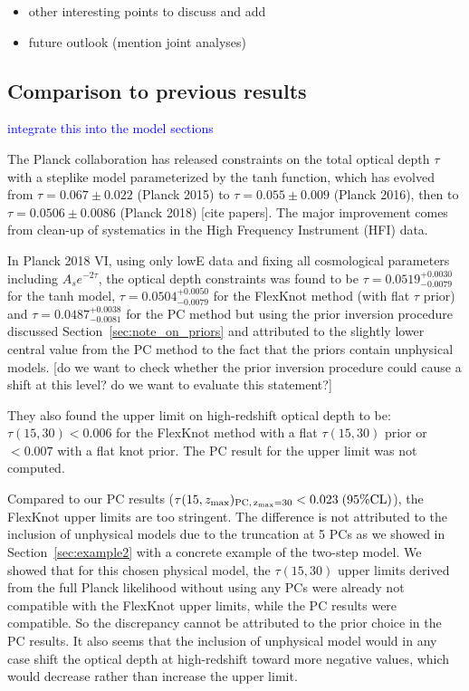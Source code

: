 \documentclass[prd,twocolumn,amsmath,amssymb,floatfix,superscriptaddress,nofootinbib]{revtex4-1}
\newcommand{\zmax}{z_{\rm max}}
\newcommand{\wh}[1]{\textcolor{blue}{#1}}
\begin{document}
\begin{itemize}
    \item other interesting points to discuss and add 
    \item future outlook (mention joint analyses)
\end{itemize}



\appendix



\subsection{Comparison to previous results}
\wh{integrate this into the model sections}

The Planck collaboration has released constraints on the total optical depth $\tau$ with a steplike model parameterized by the tanh function, which has evolved from $\tau = 0.067 \pm 0.022$ (Planck 2015) to $\tau = 0.055 \pm 0.009$ (Planck 2016), then to $\tau = 0.0506 \pm 0.0086$ (Planck 2018) [cite papers]. The major improvement comes from clean-up of systematics in the High Frequency Instrument (HFI) data. 

In Planck 2018 VI, using only lowE data and fixing all cosmological parameters including $A_s e^{-2\tau}$, the optical depth constraints was found to be $\tau = 0.0519^{+0.0030}_{-0.0079}$ for the tanh model, 
$\tau = 0.0504^{+0.0050}_{-0.0079}$ 
for the FlexKnot method (with flat $\tau$ prior) and 
$\tau = 0.0487^{+0.0038}_{-0.0081}$
for the PC method but using the prior inversion procedure
discussed Section~\ref{sec:note_on_priors} and attributed to the slightly lower central value from the PC method to the fact that the priors contain unphysical models. [do we want to check whether the prior inversion procedure could cause a shift at this level? do we want to evaluate this statement?]

They also found the upper limit on high-redshift optical depth to be: $\tau(15, 30) < 0.006$ for the FlexKnot method with a flat $\tau(15, 30)$ prior or $<0.007$ with a flat knot prior. The PC result for the upper limit was not computed. 

Compared to our PC results ($\tau(15, \zmax)_{\rm PC,\, \zmax=30} < 0.023 \; (95\% \mathrm{CL})$), the FlexKnot upper limits are too stringent. The difference is not attributed to the inclusion of unphysical models due to the truncation at 5 PCs as we showed in Section~\ref{sec:example2} with a concrete example of the two-step model. We showed that for this chosen physical model, the $\tau(15, 30)$ upper limits derived from the full Planck likelihood without using any PCs were already not compatible with the FlexKnot upper limits, while the PC results were compatible. So the discrepancy cannot be attributed to the prior choice in the PC results. It also seems that the inclusion of unphysical model would in any case shift the optical depth at high-redshift toward more negative values, which would decrease rather than increase the upper limit. 
\end{document}

